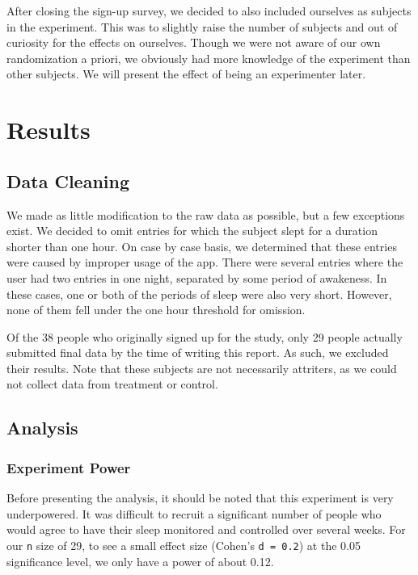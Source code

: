 \documentclass[12pt,]{article}
\begin{document}
After closing the sign-up survey, we decided to also included ourselves
as subjects in the experiment. This was to slightly raise the number of
subjects and out of curiosity for the effects on ourselves. Though we
were not aware of our own randomization a priori, we obviously had more
knowledge of the experiment than other subjects. We will present the
effect of being an experimenter later.

\section{Results}\label{results}

\subsection{Data Cleaning}\label{data-cleaning}

We made as little modification to the raw data as possible, but a few
exceptions exist. We decided to omit entries for which the subject slept
for a duration shorter than one hour. On case by case basis, we
determined that these entries were caused by improper usage of the app.
There were several entries where the user had two entries in one night,
separated by some period of awakeness. In these cases, one or both of
the periods of sleep were also very short. However, none of them fell
under the one hour threshold for omission.

Of the 38 people who originally signed up for the study, only 29 people
actually submitted final data by the time of writing this report. As
such, we excluded their results. Note that these subjects are not
necessarily attriters, as we could not collect data from treatment or
control.

\subsection{Analysis}\label{analysis}

\subsubsection{Experiment Power}\label{experiment-power}

Before presenting the analysis, it should be noted that this experiment
is very underpowered. It was difficult to recruit a significant number
of people who would agree to have their sleep monitored and controlled
over several weeks. For our \texttt{n} size of 29, to see a small effect
size (Cohen's \texttt{d\ =\ 0.2}) at the 0.05 significance level, we
only have a power of about 0.12.
\end{document}
